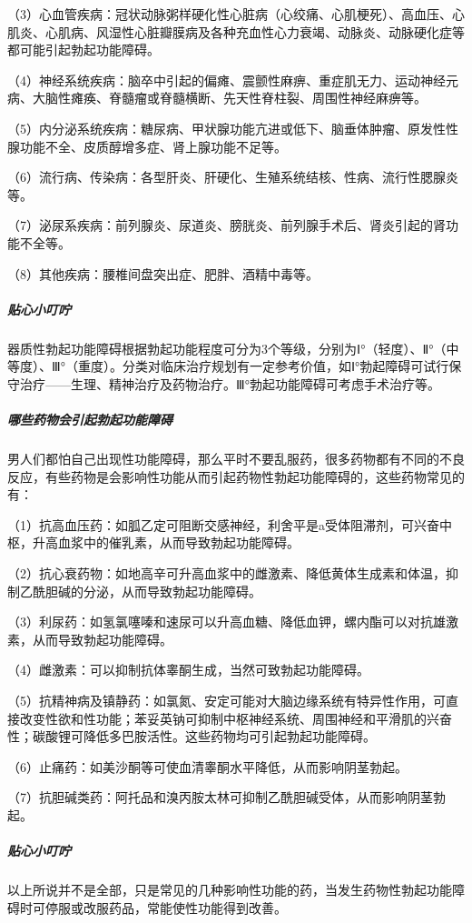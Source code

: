 （3）心血管疾病：冠状动脉粥样硬化性心脏病（心绞痛、心肌梗死）、高血压、心肌炎、心肌病、风湿性心脏瓣膜病及各种充血性心力衰竭、动脉炎、动脉硬化症等都可能引起勃起功能障碍。

（4）神经系统疾病：脑卒中引起的偏瘫、震颤性麻痹、重症肌无力、运动神经元病、大脑性瘫痪、脊髓瘤或脊髓横断、先天性脊柱裂、周围性神经麻痹等。

（5）内分泌系统疾病：糖尿病、甲状腺功能亢进或低下、脑垂体肿瘤、原发性性腺功能不全、皮质醇增多症、肾上腺功能不足等。

（6）流行病、传染病：各型肝炎、肝硬化、生殖系统结核、性病、流行性腮腺炎等。

（7）泌尿系疾病：前列腺炎、尿道炎、膀胱炎、前列腺手术后、肾炎引起的肾功能不全等。

（8）其他疾病：腰椎间盘突出症、肥胖、酒精中毒等。

\subparagraph{贴心小叮咛}

器质性勃起功能障碍根据勃起功能程度可分为3个等级，分别为Ⅰ°（轻度）、Ⅱ°（中等度）、Ⅲ°（重度）。分类对临床治疗规划有一定参考价值，如Ⅰ°勃起障碍可试行保守治疗——生理、精神治疗及药物治疗。Ⅲ°勃起功能障碍可考虑手术治疗等。

\subparagraph{哪些药物会引起勃起功能障碍}

男人们都怕自己出现性功能障碍，那么平时不要乱服药，很多药物都有不同的不良反应，有些药物是会影响性功能从而引起药物性勃起功能障碍的，这些药物常见的有：

（1）抗高血压药：如胍乙定可阻断交感神经，利舍平是a受体阻滞剂，可兴奋中枢，升高血浆中的催乳素，从而导致勃起功能障碍。

（2）抗心衰药物：如地高辛可升高血浆中的雌激素、降低黄体生成素和体温，抑制乙酰胆碱的分泌，从而导致勃起功能障碍。

（3）利尿药：如氢氯噻嗪和速尿可以升高血糖、降低血钾，螺内酯可以对抗雄激素，从而导致勃起功能障碍。

（4）雌激素：可以抑制抗体睾酮生成，当然可致勃起功能障碍。

（5）抗精神病及镇静药：如氯氮、安定可能对大脑边缘系统有特异性作用，可直接改变性欲和性功能；苯妥英钠可抑制中枢神经系统、周围神经和平滑肌的兴奋性；碳酸锂可降低多巴胺活性。这些药物均可引起勃起功能障碍。

（6）止痛药：如美沙酮等可使血清睾酮水平降低，从而影响阴茎勃起。

（7）抗胆碱类药：阿托品和溴丙胺太林可抑制乙酰胆碱受体，从而影响阴茎勃起。

\subparagraph{贴心小叮咛}

以上所说并不是全部，只是常见的几种影响性功能的药，当发生药物性勃起功能障碍时可停服或改服药品，常能使性功能得到改善。

